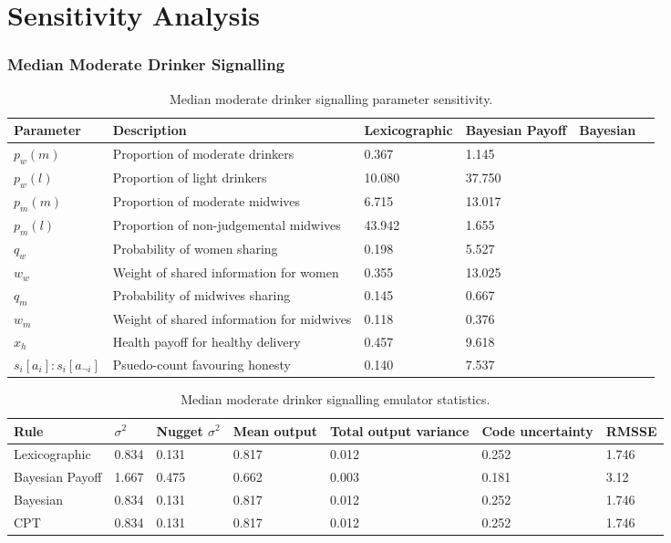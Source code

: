 \section{Sensitivity Analysis}
\label{app:sensitivity_results}

\subsubsection{Median Moderate Drinker Signalling}

\begin{table}[h!]
\center
\begin{tabular} {|l | l | l | l | l | l |}
\hline
Parameter & Description & Lexicographic & Bayesian Payoff & Bayesian & \ac(CPT) \\ \hline
\(p_{w}(m)\) & Proportion of moderate drinkers & 0.367 & 1.145 \\ \hline
\(p_{w}(l)\) & Proportion of light drinkers & 10.080 & 37.750 \\ \hline
\(p_{m}(m)\) & Proportion of moderate midwives & 6.715 & 13.017\\ \hline
\(p_{m}(l)\) & Proportion of non-judgemental midwives & 43.942 & 1.655 \\ \hline
\(q_{w}\) & Probability of women sharing & 0.198 & 5.527 \\ \hline
\(w_{w}\) & Weight of shared information for women & 0.355 & 13.025 \\ \hline
\(q_{m}\) & Probability of midwives sharing & 0.145 & 0.667 \\ \hline
\(w_{m}\) & Weight of shared information for midwives & 0.118 & 0.376 \\ \hline
\(x_{h}\) & Health payoff for healthy delivery & 0.457 & 9.618 \\ \hline
\(s_{i}[a_{i}]:s_{i}[a_{\neg i}]\) & Psuedo-count favouring honesty & 0.140 & 7.537 \\ \hline
\end{tabular}
\caption[Table caption text]{Median moderate drinker signalling parameter sensitivity. \label{tab:sa_results_sig}}
\end{table}

\begin{table}[h!]
\center
\begin{tabular} {|l | l | l | l | l | l |}
\hline
Rule & \(\sigma^2\) & Nugget \(\sigma^2\) & Mean output & Total output variance & Code uncertainty & RMSSE \\ \hline
Lexicographic & 0.834 & 0.131 &  0.817 & 0.012 & 0.252 & 1.746 \\ \hline
Bayesian Payoff & 1.667 & 0.475 &  0.662 & 0.003 & 0.181 & 3.12 \\ \hline
Bayesian & 0.834 & 0.131 &  0.817 & 0.012 & 0.252 & 1.746 \\ \hline
\ac{CPT} & 0.834 & 0.131 &  0.817 & 0.012 & 0.252 & 1.746 \\ \hline
\end{tabular}
\caption[Table caption text]{Median moderate drinker signalling emulator statistics. \label{tab:sa_emulator_sig}}
\end{table}

